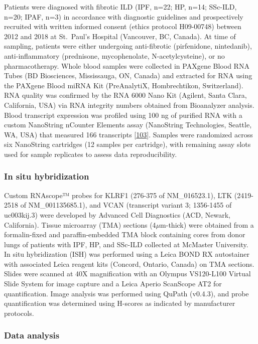 \documentclass[
]{article}
\begin{document}
Patients were diagnosed with fibrotic ILD (IPF, n=22; HP, n=14; SSc-ILD, n=20; IPAF, n=3) in accordance with diagnostic guidelines and prospectively recruited with written informed consent (ethics protocol H09-00748) between 2012 and 2018 at St.~Paul's Hospital (Vancouver, BC, Canada). At time of sampling, patients were either undergoing anti-fibrotic (pirfenidone, nintedanib), anti-inflammatory (prednisone, mycophenolate, N-acetylcysteine), or no pharmacotherapy. Whole blood samples were collected in PAXgene Blood RNA Tubes (BD Biosciences, Mississauga, ON, Canada) and extracted for RNA using the PAXgene Blood miRNA Kit (PreAnalytiX, Hombrechtikon, Switzerland). RNA quality was confirmed by the RNA 6000 Nano Kit (Agilent, Santa Clara, California, USA) via RNA integrity numbers obtained from Bioanalyzer analysis. Blood transcript expression was profiled using 100 ng of purified RNA with a custom NanoString nCounter Elements assay (NanoString Technologies, Seattle, WA, USA) that measured 166 transcripts {[}\protect\hyperlink{ref-singh_novel_2018}{103}{]}. Samples were randomized across six NanoString cartridges (12 samples per cartridge), with remaining assay slots used for sample replicates to assess data reproducibility.

\hypertarget{in-situ-hybridization}{%
\subsubsection{In situ hybridization}\label{in-situ-hybridization}}

Custom RNAscope™ probes for KLRF1 (276-375 of NM\_016523.1), LTK (2419-2518 of NM\_001135685.1), and VCAN (transcript variant 3; 1356-1455 of uc003kij.3) were developed by Advanced Cell Diagnostics (ACD, Newark, California). Tissue microarray (TMA) sections (4\(\mu\)m-thick) were obtained from a formalin-fixed and paraffin-embedded TMA block containing cores from donor lungs of patients with IPF, HP, and SSc-ILD collected at McMaster University. In situ hybridization (ISH) was performed using a Leica BOND RX autostainer with associated Leica reagent kits (Concord, Ontario, Canada) on TMA sections. Slides were scanned at 40X magnification with an Olympus VS120-L100 Virtual Slide System for image capture and a Leica Aperio ScanScope AT2 for quantification. Image analysis was performed using QuPath (v0.4.3), and probe quantification was determined using H-scores as indicated by manufacturer protocols.

\hypertarget{data-analysis}{%
\subsubsection{Data analysis}\label{data-analysis}}
\end{document}
